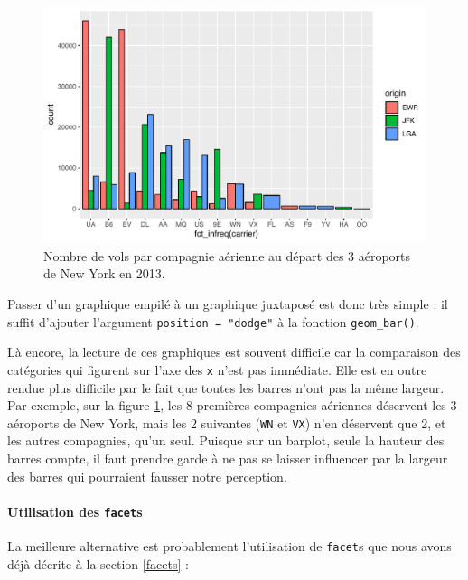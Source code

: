 \documentclass[
  a4paper,
]{article}
\begin{document}
\begin{figure}[htpb]

{\centering \includegraphics[width=0.9\linewidth]{figure/dodge-1} 

}

\caption{Nombre de vols par compagnie aérienne au départ des 3 aéroports de New York en 2013.}\label{fig:dodge}
\end{figure}

Passer d'un graphique empilé à un graphique juxtaposé est donc très simple : il suffit d'ajouter l'argument \texttt{position\ =\ "dodge"} à la fonction \texttt{geom\_bar()}.

Là encore, la lecture de ces graphiques est souvent difficile car la comparaison des catégories qui figurent sur l'axe des \texttt{x} n'est pas immédiate. Elle est en outre rendue plus difficile par le fait que toutes les barres n'ont pas la même largeur. Par exemple, sur la figure \ref{fig:dodge}, les 8 premières compagnies aériennes déservent les 3 aéroports de New York, mais les 2 suivantes (\texttt{WN} et \texttt{VX}) n'en déservent que 2, et les autres compagnies, qu'un seul. Puisque sur un barplot, seule la hauteur des barres compte, il faut prendre garde à ne pas se laisser influencer par la largeur des barres qui pourraient fausser notre perception.

\hypertarget{utilisation-des-facets}{%
\paragraph{\texorpdfstring{Utilisation des \texttt{facet}s}{Utilisation des facets}}\label{utilisation-des-facets}}

La meilleure alternative est probablement l'utilisation de \texttt{facet}s que nous avons déjà décrite à la section \ref{facets} :
\end{document}
